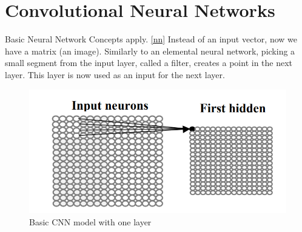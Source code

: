 \section{Convolutional Neural Networks}\label{cnn}
Basic Neural Network Concepts apply. \ref{nn} Instead of an input vector, now we have a matrix (an image). Similarly to an elemental neural network, picking a small segment from the input layer, called a filter, creates a point in the next layer. \cite{8609672} This layer is now used as an input for the next layer.

\begin{figure}[H]
    \centering
    \includegraphics[width=0.5\linewidth]{Images/cnn-layer.png}
    \caption{Basic CNN model with one layer \cite{8609672}}
    \label{fig:collaborative-filtering-diagram}
\end{figure}

